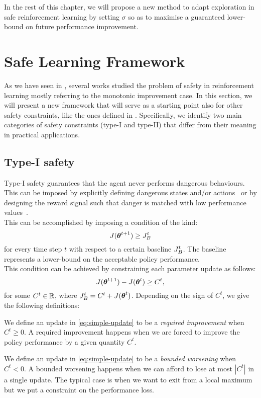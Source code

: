In the rest of this chapter, we will propose a new method to adapt exploration in safe reinforcement learning by setting $\sigma$ so as to maximise a guaranteed lower-bound on future performance improvement.


\section{Safe Learning Framework}\label{sec:framework}

As we have seen in , several works studied the problem of safety in reinforcement learning mostly referring to the monotonic improvement case. In this section, we will present a new framework that will serve as a starting point also for other safety constraints, like the ones defined in . Specifically, we identify two main categories of safety constraints (type-I and type-II) that differ from their meaning in practical applications. 

\subsection{Type-I safety} 
Type-I safety guarantees that the agent never performs dangerous behaviours. This can be imposed by explicitly defining dangerous states and/or actions~\cite{gehring2013smart} or by designing the reward signal such that danger is matched with low performance values~\cite{safe_iteration}\cite{trpo}\cite{Petrik:2016:SPI:3157096.3157354}.\\
This can be accomplished by imposing a condition of the kind:%
%
\begin{equation}
J(\vtheta^{t+1}) \geq \jbase
\end{equation}
for every time step $t$ with respect to a certain baseline $\jbase$. The baseline represents a lower-bound on the acceptable policy performance.\\
This condition can be achieved by constraining each parameter update as follows:
\begin{equation}\label{eq:simple-update}
J(\vtheta^{t+1}) - J(\vtheta^{t}) \geq C^t,
\end{equation}
for some $C^t\in \realspace$, where $\jbase[t]=C^t + J(\vtheta^t)$. Depending on the sign of $C^t$, we give the following definitions:
\begin{definition}\label{def:required-improvement}
We define an update in \ref{eq:simple-update} to be a \textit{required improvement} when $C^t \geq 0$. A required improvement happens when we are forced to improve the policy performance by a given quantity $C^t$.
\end{definition}
\begin{definition}\label{def:bounded-worsening}
We define an update in \ref{eq:simple-update} to be a \textit{bounded worsening} when $C^t < 0$. A bounded worsening happens when we can afford to lose at most $|C^t|$ in a single update. The typical case is when we want to exit from a local maximum but we put a constraint on the performance loss.
\end{definition}


